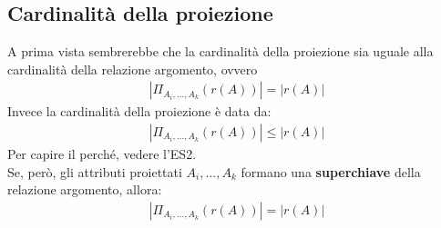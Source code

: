 \subsection{Cardinalità della proiezione}
A prima vista sembrerebbe che la cardinalità della proiezione sia uguale alla cardinalità della relazione argomento, ovvero
    \begin{equation}\begin{aligned}
        |\Pi_{A_i, ..., A_k}(r(A))| = |r(A)|
    \end{aligned}\end{equation}
Invece la cardinalità della proiezione è data da:
    \begin{equation}\begin{aligned}
        |\Pi_{A_i, ..., A_k}(r(A))| \leq |r(A)|
    \end{aligned}\end{equation}
Per capire il perché, vedere l'ES2.\\
Se, però, gli attributi proiettati $A_i, ..., A_k$ formano una \textbf{superchiave} della relazione argomento, allora:
    \begin{equation}\begin{aligned}
        |\Pi_{A_i, ..., A_k}(r(A))| = |r(A)|
    \end{aligned}\end{equation}

